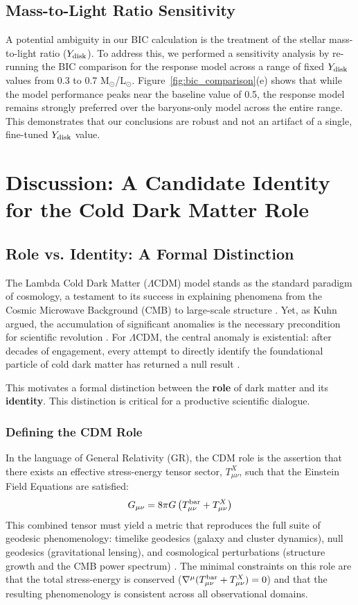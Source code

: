 \documentclass[12pt,onecolumn]{aastex631}
\newcommand{\tbar}{T^{\rm bar}_{\mu\nu}}
\newcommand{\gx}{T^{X}_{\mu\nu}}
\begin{document}
\subsection{Mass-to-Light Ratio Sensitivity}
A potential ambiguity in our BIC calculation is the treatment of the stellar mass-to-light ratio (\(Y_{\rm disk}\)). To address this, we performed a sensitivity analysis by re-running the BIC comparison for the response model across a range of fixed \(Y_{\rm disk}\) values from 0.3 to 0.7 M\(_\odot\)/L\(_\odot\). Figure~\ref{fig:bic_comparison}(e) shows that while the model performance peaks near the baseline value of 0.5, the response model remains strongly preferred over the baryons-only model across the entire range. This demonstrates that our conclusions are robust and not an artifact of a single, fine-tuned \(Y_{\rm disk}\) value.

\section{Discussion: A Candidate Identity for the Cold Dark Matter Role}

\subsection{Role vs. Identity: A Formal Distinction}
The Lambda Cold Dark Matter (\(\Lambda\)CDM) model stands as the standard paradigm of cosmology, a testament to its success in explaining phenomena from the Cosmic Microwave Background (CMB) to large-scale structure \citep{Planck2020}. Yet, as Kuhn argued, the accumulation of significant anomalies is the necessary precondition for scientific revolution \citep{Kuhn1962}. For \(\Lambda\)CDM, the central anomaly is existential: after decades of engagement, every attempt to directly identify the foundational particle of cold dark matter has returned a null result \citep{Undagoitia2016, LZ2023}.

This motivates a formal distinction between the \textbf{role} of dark matter and its \textbf{identity}. This distinction is critical for a productive scientific dialogue.

\subsubsection{Defining the CDM Role}
In the language of General Relativity (GR), the CDM role is the assertion that there exists an effective stress-energy tensor sector, \(\gx\), such that the Einstein Field Equations are satisfied:
\begin{equation}
G_{\mu\nu}=8\pi G\left(\tbar+\gx\right)
\end{equation}
This combined tensor must yield a metric that reproduces the full suite of geodesic phenomenology: timelike geodesics (galaxy and cluster dynamics), null geodesics (gravitational lensing), and cosmological perturbations (structure growth and the CMB power spectrum) \citep{Planck2020}. The minimal constraints on this role are that the total stress-energy is conserved (\(\nabla^\mu(\tbar+\gx)=0\)) and that the resulting phenomenology is consistent across all observational domains.
\end{document}
